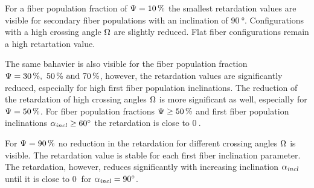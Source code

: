For a fiber population fraction of $\textnormal{$\Psi$}=\SI{10}{\percent}$ the smallest retardation values are visible for secondary fiber populations with an inclination of $\SI{90}{\degree}$.
Configurations with a high crossing angle $\textnormal{$\Omega$}$ are slightly reduced.
Flat fiber configurations remain a high retartation value.
\par
%
The same bahavier is also visible for the fiber population fraction $\modelPsi=\SIlist{30;50;70}{\percent}$, however, the retardation values are significantly reduced, especially for high first fiber population inclinations.
The reduction of the retardation of high crossing angles $\textnormal{$\Omega$}$ is more significant as well, especially for $\textnormal{$\Psi$}=\SI{50}{\percent}$.
For fiber population fractions $\textnormal{$\Psi$} \geq \SI{50}{\percent}$ and first fiber population inclinations $\textnormal{$\alpha_{\mathit{incl}}$} \geq \SI{60}{\degree}$ the retardation is close to $\SI{0}{}$.
\par
%
For $\textnormal{$\Psi$}=\SI{90}{\percent}$ no reduction in the retardation for different crossing angles $\textnormal{$\Omega$}$ is visible.
The retardation value is stable for each first fiber inclination parameter.
The retardation, however, reduces significantly with increasing inclination $\textnormal{$\alpha_{\mathit{incl}}$}$ until it is close to $\SI{0}{}$ for $\textnormal{$\alpha_{\mathit{incl}}$}=\SI{90}{\degree}$.
% 
% 
% 
